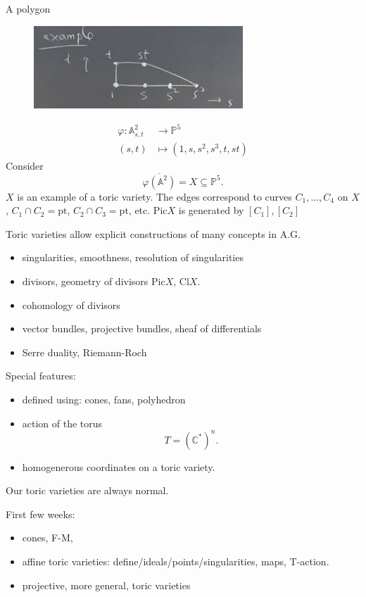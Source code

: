 \documentclass[a4paper,12pt]{amsart}
\newcommand{\CC}{\mathbb{C}}
\newcommand{\PP}{\mathbb{P}}
\begin{document}
\begin{Eg}
A polygon
\begin{figure}[h]
\centering
\includegraphics[width=0.7\textwidth]{pic/lec01pic01}
\end{figure}
\begin{align*}
\varphi:\mathbb{A}^2_{s,t}&\rightarrow\PP^5\\
(s,t)&\mapsto(1,s,s^2,s^3,t,st)
\end{align*}
Consider
\begin{equation*}
\overline{\varphi(\mathbb{A}^2)}=X\subseteq\PP^5.
\end{equation*}
$X$ is an example of a toric variety.
The edges correspond to curves $C_1,\dots,C_4$ on $X$, $C_1\cap C_2=\text{pt}$, $C_2\cap C_3=\text{pt}$, etc. $\text{Pic}X$ is generated by $[C_1],[C_2]$
\end{Eg}
Toric varieties allow explicit constructions of many concepts in A.G.
\begin{itemize}
\item singularities, smoothness, resolution of singularities 
\item divisors, geometry of divisors $\text{Pic}X$, $\text{Cl}X$.
\item cohomology of divisors
\item vector bundles, projective bundles, sheaf of differentials
\item  Serre duality, Riemann-Roch
\end{itemize}

Special features:
\begin{itemize}
\item defined using: cones, fans, polyhedron
\item action of the torus
\begin{equation*}
T=(\CC^*)^n.
\end{equation*}
\item homogenerous coordinates on a toric variety.
\end{itemize}

\begin{Caution}
Our toric varieties are always normal.
\end{Caution}
First few weeks:
\begin{itemize} 
\item cones, F-M,
\item affine toric varieties: define/ideals/points/singularities, maps, T-action.
\item projective, more general, toric varieties
\end{itemize} 
\end{document}
